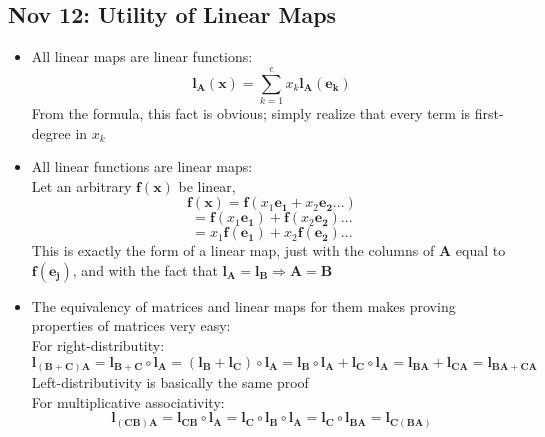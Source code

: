 \documentclass[10pt, oneside]{article}
\renewcommand{\vec}[1]{\mathbf{#1}}
\newcommand{\vecf}[1]{\boldsymbol{#1}}
\newcommand{\mat}[1]{\mathbf{#1}}
\begin{document}
\subsection{Nov 12: Utility of Linear Maps}
\begin{itemize}
    \item All linear maps are linear functions:
        \[\vecf{l}_\mat{A}(\vec{x}) = \sum_{k=1}^e x_k \vecf{l}_\mat{A}(\vec{e_k})\]
        From the formula, this fact is obvious; simply realize that every term is first-degree in $x_k$
    \item All linear functions are linear maps:\\
        Let an arbitrary $\vecf{f}(\vec{x})$ be linear,
        \[\vecf{f}(\vec{x}) = \vecf{f}(x_1 \vec{e_1} + x_2 \vec{e_2} ...)\]
        \[= \vecf{f}(x_1 \vec{e_1}) + \vecf{f}(x_2 \vec{e_2}) ...\]
        \[= x_1 \vecf{f}(\vec{e_1}) + x_2 \vecf{f}(\vec{e_2}) ...\]
        This is exactly the form of a linear map, just with the columns of $\mat{A}$ equal to $\vecf{f}(\vec{e_j})$, and with the fact that $\vecf{l}_\mat{A} = \vecf{l}_\mat{B} \Rightarrow \mat{A} = \mat{B}$
    \item The equivalency of matrices and linear maps for them makes proving properties of matrices very easy:\\
        For right-distributity:
        \[\vecf{l}_{(\mat{B}+\mat{C})\mat{A}} = \vecf{l}_{\mat{B}+\mat{C}} \circ \vecf{l}_\mat{A} = (\vecf{l}_\mat{B} + \vecf{l}_\mat{C}) \circ \vecf{l}_\mat{A} = \vecf{l}_\mat{B} \circ \vecf{l}_\mat{A} + \vecf{l}_\mat{C} \circ \vecf{l}_\mat{A} = \vecf{l}_{\mat{B}\mat{A}} + \vecf{l}_{\mat{C}\mat{A}} = \vecf{l}_{\mat{B}\mat{A} + \mat{C}\mat{A}}\]
        Left-distributivity is basically the same proof\\
        For multiplicative associativity:
        \[\vecf{l}_{(\mat{C}\mat{B})\mat{A}} = \vecf{l}_{\mat{C}\mat{B}} \circ \vecf{l}_\mat{A} = \vecf{l}_\mat{C} \circ \vecf{l}_\mat{B} \circ \vecf{l}_\mat{A} = \vecf{l}_\mat{C} \circ \vecf{l}_{\mat{B}\mat{A}} = \vecf{l}_{\mat{C}(\mat{B}\mat{A})}\]
\end{itemize}
\end{document}
